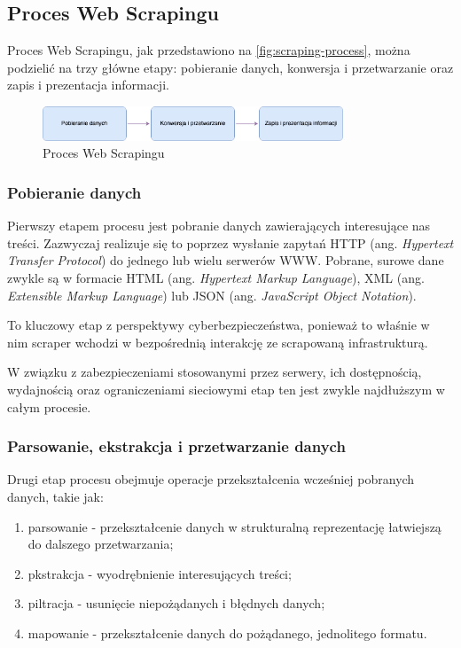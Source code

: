 \subsection{Proces Web Scrapingu}\label{subsec:web-scraping-process}

Proces Web Scrapingu, jak przedstawiono na \autoref{fig:scraping-process}, można podzielić na trzy główne etapy: pobieranie danych, konwersja i przetwarzanie oraz zapis i prezentacja informacji\cite{persson}.

\begin{figure}[H]
    \centering
    \includegraphics[width=0.8\textwidth]{img/scraping-process}
    \caption{Proces Web Scrapingu}
    \label{fig:scraping-process}
\end{figure}

\subsubsection{Pobieranie danych}

Pierwszy etapem procesu jest pobranie danych zawierających interesujące nas treści.
Zazwyczaj realizuje się to poprzez wysłanie zapytań HTTP (ang. \emph{Hypertext Transfer Protocol}) do jednego lub wielu serwerów WWW\@.
Pobrane, surowe dane zwykle są w formacie HTML (ang. \emph{Hypertext Markup Language}), XML (ang. \emph{Extensible Markup Language}) lub JSON (ang. \emph{JavaScript Object Notation}).

To kluczowy etap z perspektywy cyberbezpieczeństwa, ponieważ to właśnie w nim scraper wchodzi w bezpośrednią interakcję ze scrapowaną infrastrukturą.

W związku z zabezpieczeniami stosowanymi przez serwery, ich dostępnością, wydajnością oraz ograniczeniami sieciowymi etap ten jest zwykle najdłuższym w całym procesie.

\subsubsection{Parsowanie, ekstrakcja i przetwarzanie danych}

Drugi etap procesu obejmuje operacje przekształcenia wcześniej pobranych danych, takie jak:
\begin{enumerate}
    \item parsowanie - przekształcenie danych w strukturalną reprezentację łatwiejszą do dalszego przetwarzania;
    \item pkstrakcja - wyodrębnienie interesujących treści;
    \item piltracja - usunięcie niepożądanych i błędnych danych;
    \item mapowanie - przekształcenie danych do pożądanego, jednolitego formatu.
\end{enumerate}

